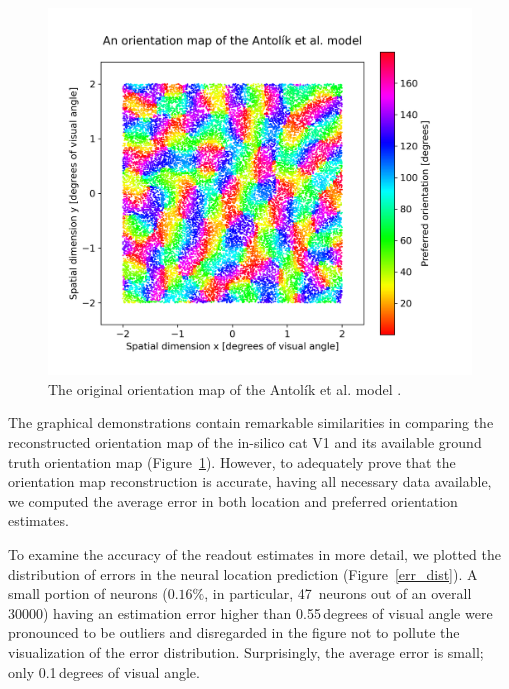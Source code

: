 \begin{figure}[H]\centering
	\includegraphics[width=150mm]{../img/reconstructed_orientation_maps_best_truth.png}
	\caption{The original orientation map of the Antolík et al. model \citep{antolik2019comprehensive}.}
	\label{ground_truth}
\end{figure}

The graphical demonstrations contain remarkable similarities in comparing the reconstructed orientation map of the in-silico cat V1 and its available ground truth orientation map (Figure~\ref{ground_truth}). However, to adequately prove that the orientation map reconstruction is accurate, having all necessary data available, we computed the average error in both location and preferred orientation estimates.

To examine the accuracy of the readout estimates in more detail, we plotted the distribution of errors in the neural location prediction (Figure~\ref{err_dist}). A small portion of neurons ($0.16 \%$, in particular, 47~neurons out of an overall 30000) having an estimation error higher than 0.55\,degrees of visual angle were pronounced to be outliers and disregarded in the figure not to pollute the visualization of the error distribution. Surprisingly, the average error is small; only 0.1\,degrees of visual angle.

